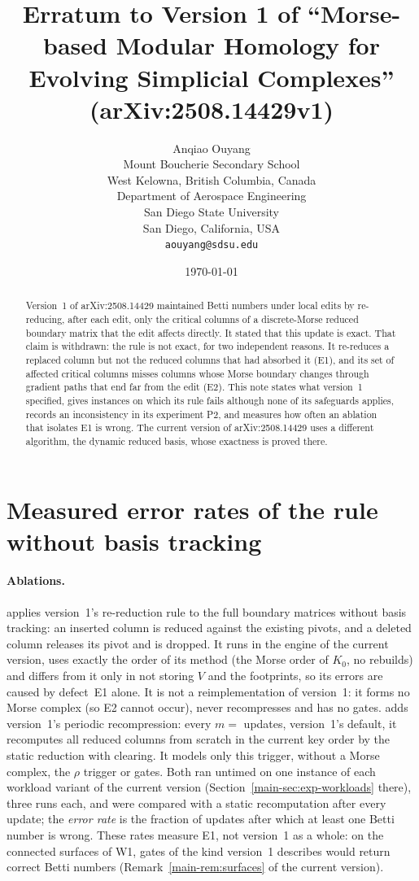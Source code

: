 \documentclass[10pt]{article}
\title{Erratum to Version 1 of ``Morse-based Modular Homology for Evolving
  Simplicial Complexes'' (arXiv:2508.14429v1)}
\author{%
  Anqiao Ouyang\\
  Mount Boucherie Secondary School\\
  West Kelowna, British Columbia, Canada\\[11pt]
  Department of Aerospace Engineering\\
  San Diego State University\\
  San Diego, California, USA\\
  \texttt{aouyang@sdsu.edu}}
\date{\today}
\begin{document}
\maketitle

\begin{abstract}
Version~1 of arXiv:2508.14429 maintained Betti numbers under local edits by
re-reducing, after each edit, only the critical columns of a discrete-Morse
reduced boundary matrix that the edit affects directly. It stated that this
update is exact. That claim is withdrawn: the rule is not exact, for two
independent reasons. It re-reduces a replaced column but not the reduced
columns that had absorbed it (E1), and its set of affected critical columns
misses columns whose Morse boundary changes through gradient paths that end far
from the edit (E2). This note states what version~1 specified, gives instances
on which its rule fails although none of its safeguards applies, records an
inconsistency in its experiment P2, and measures how often an ablation that
isolates E1 is wrong. The current version of arXiv:2508.14429 uses a different
algorithm, the dynamic reduced basis, whose exactness is proved there.
\end{abstract}



\section{Measured error rates of the rule without basis tracking}\label{sec:lcr}

\paragraph{Ablations.}
 applies version~1's re-reduction rule to the full boundary matrices
without basis tracking: an inserted column is reduced against the existing
pivots, and a deleted column releases its pivot and is dropped. It runs in the
engine of the current version, uses exactly the order of its method
 (the Morse order of $K_0$, no rebuilds) and differs from it
only in not storing $V$ and the footprints, so its errors are caused by
defect~E1 alone. It is not a reimplementation of version~1: it forms no Morse
complex (so E2 cannot occur), never recompresses and has no gates.
 adds version~1's periodic recompression: every
$m={}$\NumLcrRcPeriod{} updates, version~1's default, it recomputes all reduced
columns from scratch in the current key order by the static reduction with
clearing. It models only this trigger, without a Morse complex, the $\rho$
trigger or gates. Both ran untimed on one instance of each workload variant of
the current version (Section~\ref{main-sec:exp-workloads} there), three runs
each, and were compared with a static recomputation after every update; the
\emph{error rate} is the fraction of updates after which at least one Betti
number is wrong. These rates measure E1, not version~1 as a whole: on the
connected surfaces of W1, gates of the kind version~1 describes would return
correct Betti numbers (Remark~\ref{main-rem:surfaces} of the current version).
\end{document}
